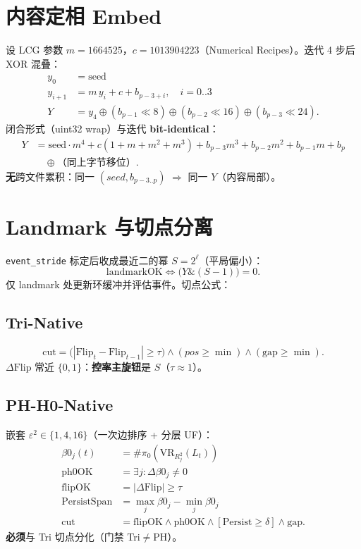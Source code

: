 \section{内容定相 Embed}

设 LCG 参数 $m=1664525$，$c=1013904223$（Numerical Recipes）。迭代 4 步后 XOR 混叠：
\begin{align}
y_0&=\mathrm{seed}\\
y_{i+1}&= m\,y_i + c + b_{p-3+i},\quad i=0..3\\
Y &= y_4 \oplus (b_{p-1}\!\ll\!8)\oplus(b_{p-2}\!\ll\!16)\oplus(b_{p-3}\!\ll\!24).
\end{align}
闭合形式（uint32 wrap）与迭代 \textbf{bit-identical}：
\begin{align}
Y &= \mathrm{seed}\cdot m^4 + c(1+m+m^2+m^3)
 + b_{p-3}m^3 + b_{p-2}m^2 + b_{p-1}m + b_p \nonumber\\
&\quad\oplus\text{（同上字节移位）}.
\end{align}
\textbf{无}跨文件累积：同一 $(seed,b_{p-3..p})$ $\Rightarrow$ 同一 $Y$（内容局部）。

\section{\texorpdfstring{Landmark 与切点分离}{Landmark 与切点分离}}

\texttt{event\_stride} 标定后收成最近二的幂 $S=2^\ell$（平局偏小）：
\begin{equation}
\mathrm{landmarkOK}\iff \bigl(Y \mathbin{\&}(S-1)\bigr)=0.
\end{equation}
仅 landmark 处更新环缓冲并评估事件。切点公式：

\subsection{Tri-Native}
\begin{equation}
\mathrm{cut}
=\bigl(|\mathrm{Flip}_t-\mathrm{Flip}_{t-1}|\ge\tau\bigr)
\land(pos\ge\min)\land(\mathrm{gap}\ge\min).
\end{equation}
$\Delta\mathrm{Flip}$ 常近 $\{0,1\}$：\textbf{控率主旋钮}是 $S$（$\tau\approx1$）。

\subsection{\texorpdfstring{PH-H0-Native}{PH-H0-Native}}
嵌套 $\varepsilon^2\in\{1,4,16\}$（一次边排序 + 分层 UF）：
\begin{align}
\beta0_j(t)&=\#\pi_0(\mathrm{VR}_{R_j^2}(L_t))\\
\mathrm{ph0OK}&=\exists j:\Delta\beta0_j\neq 0\\
\mathrm{flipOK}&=|\Delta\mathrm{Flip}|\ge\tau\\
\mathrm{PersistSpan}&=\max_j\beta0_j-\min_j\beta0_j\\
\mathrm{cut}&=\mathrm{flipOK}\land\mathrm{ph0OK}\land[\mathrm{Persist}\ge\delta]\land\mathrm{gap}.
\end{align}
\textbf{必须}与 Tri 切点分化（门禁 Tri$\neq$PH）。

